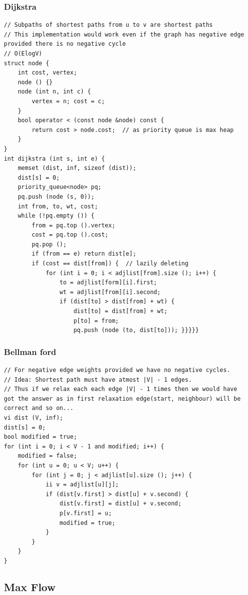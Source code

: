 \documentclass[8pt, a4paper, oneside, twocolumn]{extarticle}
\begin{document}
\subsubsection{Dijkstra}
\begin{verbatim}
// Subpaths of shortest paths from u to v are shortest paths
// This implementation would work even if the graph has negative edge provided there is no negative cycle
// O(ElogV)
struct node {
    int cost, vertex;
    node () {}
    node (int n, int c) {
        vertex = n; cost = c;
    }
    bool operator < (const node &node) const {
        return cost > node.cost;  // as priority queue is max heap
    }
}
int dijkstra (int s, int e) {
    memset (dist, inf, sizeof (dist));
    dist[s] = 0;
    priority_queue<node> pq;
    pq.push (node (s, 0));
    int from, to, wt, cost;
    while (!pq.empty ()) {
        from = pq.top ().vertex;
        cost = pq.top ().cost;
        pq.pop ();
        if (from == e) return dist[e];
        if (cost == dist[from]) {  // lazily deleting
            for (int i = 0; i < adjlist[from].size (); i++) {
                to = adjlist[form][i].first;
                wt = adjlist[from][i].second;
                if (dist[to] > dist[from] + wt) {
                    dist[to] = dist[from] + wt;
                    p[to] = from;
                    pq.push (node (to, dist[to])); }}}}}
\end{verbatim}
\subsubsection{Bellman ford}
\begin{verbatim} 
// For negative edge weights provided we have no negative cycles.
// Idea: Shortest path must have atmost |V| - 1 edges.
// Thus if we relax each each edge |V| - 1 times then we would have got the answer as in first relaxation edge(start, neighbour) will be correct and so on...
vi dist (V, inf);
dist[s] = 0;
bool modified = true;
for (int i = 0; i < V - 1 and modified; i++) {
    modified = false;
    for (int u = 0; u < V; u++) {
        for (int j = 0; j < adjlist[u].size (); j++) {
            ii v = adjlist[u][j];
            if (dist[v.first] > dist[u] + v.second) {
                dist[v.first] = dist[u] + v.second;
                p[v.first] = u;
                modified = true;
            }
        }
    }
}
\end{verbatim}
\subsection{Max Flow}
\end{document}
